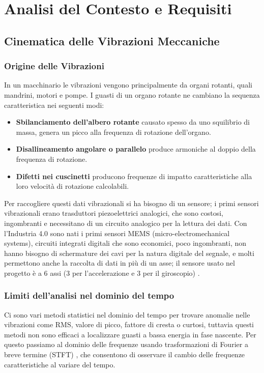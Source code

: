 \chapter{Analisi del Contesto e Requisiti}

\section{Cinematica delle Vibrazioni Meccaniche}
\subsection{Origine delle Vibrazioni}
In un macchinario le vibrazioni vengono principalmente da organi rotanti, quali mandrini, motori e pompe. 
I guasti di un organo rotante ne cambiano la sequenza caratteristica nei seguenti modi:
\begin{itemize}
	\item \textbf{Sbilanciamento dell'albero rotante} causato spesso da uno squilibrio di massa, genera un picco alla frequenza di rotazione dell'organo.
	\item \textbf{Disallineamento angolare o parallelo} produce armoniche al doppio della frequenza di rotazione.
	\item \textbf{Difetti nei cuscinetti} producono frequenze di impatto caratteristiche alla loro velocità di rotazione calcolabili.
\end{itemize}
Per raccogliere questi dati vibrazionali si ha bisogno di un sensore; i primi sensori vibrazionali erano trasduttori piezoelettrici analogici, che sono costosi, ingombranti e necessitano di un circuito analogico per la lettura dei dati. Con l'Industria 4.0 sono nati i primi sensori MEMS (micro-electromechanical systems), circuiti integrati digitali che sono economici, poco ingombranti, non hanno bisogno di schermature dei cavi per la natura digitale del segnale, e molti permettono anche la raccolta di dati in più di un asse; il sensore usato nel progetto è a 6 assi (3 per l'accelerazione e 3 per il giroscopio) \cite{ism330bx_datasheet}.

\subsection{Limiti dell'analisi nel dominio del tempo}
Ci sono vari metodi statistici nel dominio del tempo per trovare anomalie nelle vibrazioni come RMS, valore di picco, fattore di cresta o curtosi, tuttavia questi metodi non sono efficaci a localizzare guasti a bassa energia in fase nascente. Per questo passiamo al dominio delle frequenze usando trasformazioni di Fourier a breve termine (STFT) \cite{lyons2010dsp}, che consentono di osservare il cambio delle frequenze caratteristiche al variare del tempo.


